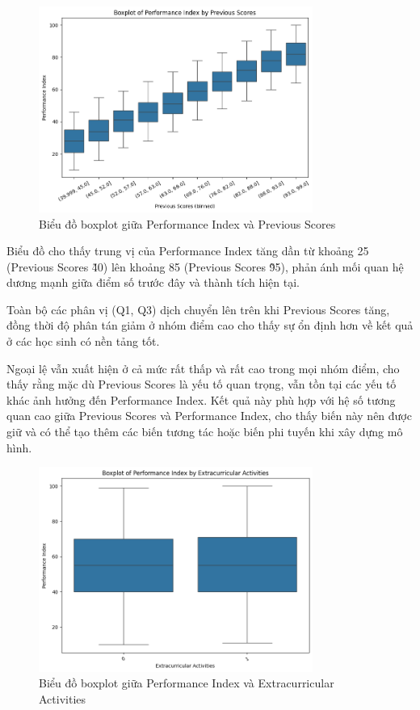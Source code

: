 \begin{figure}[H]
	\centering
	\includegraphics[width=0.8\textwidth]{images/eda/4.png}
	\caption{Biểu đồ boxplot giữa Performance Index và Previous Scores}
\end{figure}

Biểu đồ cho thấy trung vị của Performance Index tăng dần từ khoảng 25 (Previous Scores \~ 40) lên khoảng 85 (Previous Scores \~ 95), phản ánh mối quan hệ dương mạnh giữa điểm số trước đây và thành tích hiện tại.

Toàn bộ các phân vị (Q1, Q3) dịch chuyển lên trên khi Previous Scores tăng, đồng thời độ phân tán giảm ở nhóm điểm cao cho thấy sự ổn định hơn về kết quả ở các học sinh có nền tảng tốt.

Ngoại lệ vẫn xuất hiện ở cả mức rất thấp và rất cao trong mọi nhóm điểm, cho thấy rằng mặc dù Previous Scores là yếu tố quan trọng, vẫn tồn tại các yếu tố khác ảnh hưởng đến Performance Index. Kết quả này phù hợp với hệ số tương quan cao giữa Previous Scores và Performance Index, cho thấy biến này nên được giữ và có thể tạo thêm các biến tương tác hoặc biến phi tuyến khi xây dựng mô hình.

\begin{figure}[H]
	\centering
	\includegraphics[width=0.8\textwidth]{images/eda/5.png}
	\caption{Biểu đồ boxplot giữa Performance Index và Extracurricular Activities}
\end{figure}

